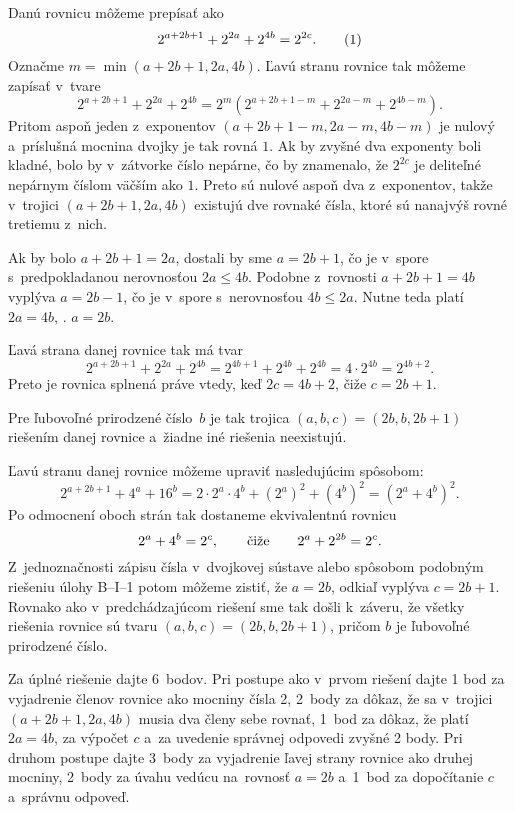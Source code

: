 {%
Danú rovnicu môžeme prepísať ako
$$
2^{a+2b+1}+2^{2a}+2^{4b}=2^{2c}.
\tag1
$$
Označme $m=\min(a+2b+1,2a,4b)$.
Ľavú stranu rovnice  tak môžeme zapísať v~tvare
$$
2^{a+2b+1}+2^{2a}+2^{4b}=2^m(2^{a+2b+1-m}+2^{2a-m}+2^{4b-m}).
$$
Pritom aspoň jeden z~exponentov $(a+2b+1-m,2a-m,4b-m)$ je nulový
a~príslušná mocnina dvojky je tak rovná $1$. Ak by zvyšné dva exponenty
boli kladné, bolo by v~zátvorke číslo nepárne, čo by znamenalo, že $2^{2c}$ je
deliteľné nepárnym číslom väčším ako $1$. Preto sú nulové aspoň dva
z~exponentov, takže v~trojici $(a+2b+1,2a,4b)$ existujú dve rovnaké čísla,
ktoré sú nanajvýš rovné tretiemu z~nich.

Ak by bolo $a+2b+1=2a$, dostali
by sme $a=2b+1$, čo je v~spore s~predpokladanou nerovnosťou $2a\le 4b$.
Podobne z~rovnosti
$a+2b+1=4b$ vyplýva $a=2b-1$, čo je v~spore s~nerovnosťou $4b\le 2a$. Nutne teda platí
$2a=4b$, \tj. $a=2b$.

Ľavá strana danej rovnice tak má tvar
$$
2^{a+2b+1}+2^{2a}+2^{4b}=2^{4b+1}+2^{4b}+2^{4b}=4\cdot2^{4b}=2^{4b+2}.
$$
Preto je rovnica splnená práve vtedy, keď $2c=4b+2$, čiže $c=2b+1$.

Pre ľubovoľné prirodzené číslo~$b$ je tak trojica $(a,b,c)=(2b,b,2b+1)$
riešením danej rovnice a~žiadne iné riešenia neexistujú.

\ineriesenie
Ľavú stranu danej rovnice môžeme upraviť nasledujúcim spôsobom:
$$
2^{a+2b+1}+4^a+16^b=2\cdot2^a\cdot4^b+(2^a)^2+(4^b)^2=(2^a+4^b)^2.
$$
Po odmocnení oboch strán tak dostaneme ekvivalentnú rovnicu
$$
2^a+4^b=2^c,\qquad \hbox{čiže}\qquad 2^a+2^{2b}=2^c.
$$
Z~jednoznačnosti zápisu čísla v~dvojkovej sústave alebo spôsobom podobným
riešeniu úlohy B--I--1 potom môžeme zistiť, že $a=2b$, odkiaľ vyplýva $c=2b+1$.
Rovnako ako v~predchádzajúcom riešení sme tak došli k~záveru, že všetky riešenia
rovnice sú tvaru $(a,b,c)=(2b,b,2b+1)$, pričom $b$ je ľubovoľné prirodzené
číslo.


\nobreak\medskip\petit\noindent
Za úplné riešenie dajte 6~bodov. Pri postupe ako v~prvom riešení
dajte 1 bod za vyjadrenie členov rovnice ako mocniny čísla 2, 2~body za
dôkaz, že sa v~trojici $(a+2b+1,2a,4b)$ musia dva členy sebe rovnať, 1~bod za
dôkaz, že platí $2a=4b$, za výpočet $c$ a~za uvedenie správnej odpovedi
zvyšné 2 body. Pri druhom postupe dajte 3~body za
vyjadrenie ľavej strany rovnice ako druhej mocniny, 2~body za úvahu vedúcu
na~rovnosť $a=2b$ a~1~bod za dopočítanie
$c$ a~správnu odpoveď.
\endpetit}

